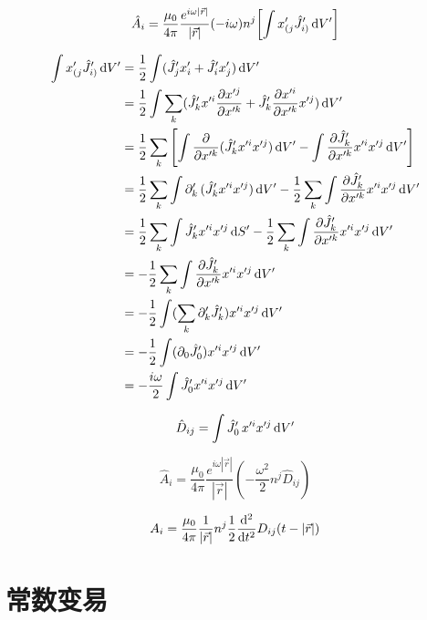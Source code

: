 \begin{equation}
    \hat{A}_i=\frac{\mu_0}{4\pi}\frac{e^{i\omega\left\lvert\vec{r}\right\rvert}}{\left\lvert\vec{r}\right\rvert}(-i\omega)n^j\!\left[\int {x}_{(j}'\hat{J}_{i)}'\,\mathrm{d} V'\right]
\end{equation}

\begin{align}
    \int {x}_{(j}'\hat{J}_{i)}'\,\mathrm{d} V'
    &= \frac{1}{2}\int (\hat{J}_{j}'{x}_{i}'+\hat{J}_{i}'{x}_{j}')\,\mathrm{d} V'\\
    &= \frac{1}{2}\int \sum_{k}(\hat{J}_{k}'x'^{i}\frac{\partial x'^{j}}{\partial x'^{k}}+\hat{J}_{k}'\frac{\partial x'^{i}}{\partial x'^{k}}x'^{j})\,\mathrm{d} V'\\
    &= \frac{1}{2}\sum_{k}\left[\int \frac{\partial }{\partial x'^k}(\hat{J}_{k}'x'^ix'^j)\,\mathrm{d} V'-\int \frac{\partial \hat{J}_{k}'}{\partial x'^k}x'^ix'^j\,\mathrm{d} V'\right]\\
    &= \frac{1}{2}\sum_{k}\int \partial'_k\,(\hat{J}_{k}'x'^ix'^j)\,\mathrm{d} V' -\frac{1}{2}\sum_{k}\int \frac{\partial \hat{J}_{k}'}{\partial x'^k}x'^ix'^j\,\mathrm{d} V'\\
    &= \frac{1}{2}\sum_{k}\int \hat{J}_{k}'x'^ix'^j\,\mathrm{d} S' -\frac{1}{2}\sum_{k}\int \frac{\partial \hat{J}_{k}'}{\partial x'^k}x'^ix'^j\,\mathrm{d} V'\\
    &= -\frac{1}{2}\sum_{k}\int \frac{\partial \hat{J}_{k}'}{\partial x'^k}x'^ix'^j\,\mathrm{d} V'\\
    &= -\frac{1}{2}\int (\sum_{k}\partial'_k\hat{J}_{k}')x'^ix'^j\,\mathrm{d} V'\\
    &= -\frac{1}{2}\int (\partial_0\hat{J}_{0}')x'^ix'^j\,\mathrm{d} V'\\
    &= -\frac{i\omega}{2}\int \hat{J}_{0}'x'^ix'^j\,\mathrm{d} V'
\end{align}

\begin{equation}
    \hat{D}_{ij}=\int \hat{J}_{0}'\,x'^ix'^j\,\mathrm{d} V'
\end{equation}

\begin{equation}
    \hat{A}_i=\frac{\mu_0}{4\pi}\frac{e^{i\omega\left\lvert\vec{r}\right\rvert}}{\left\lvert\vec{r}\right\rvert}(-\frac{\omega^2}{2}n^j\hat{D}_{ij}
    )
\end{equation}

\begin{equation}
    {A}_i=\frac{\mu_0}{4\pi}\frac{1}{\left\lvert\vec{r}\right\rvert}n^j\frac{1}{2}\frac{\mathrm{d}^2}{\mathrm{d} t^2}D_{ij}(t-\left\lvert\vec{r}\right\rvert)
\end{equation}

\section{常数变易}

